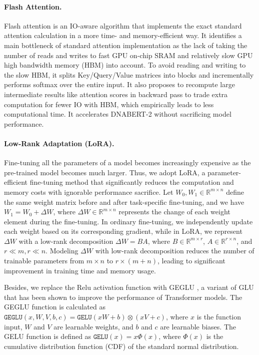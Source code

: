 \documentclass{article}
\begin{document}
\paragraph{Flash Attention.} Flash attention is an IO-aware algorithm that implements the exact standard attention calculation in a more time- and memory-efficient way. It identifies a main bottleneck of standard attention implementation as the lack of taking the number of reads and writes to fast GPU on-chip SRAM and relatively slow GPU high bandwidth memory (HBM) into account. To avoid reading and writing to the slow HBM, it splits Key/Query/Value matrices into blocks and incrementally performs softmax over the entire input. It also proposes to recompute large intermediate results like attention scores in backward pass to trade extra computation for fewer IO with HBM, which empirically leads to less computational time. It accelerates DNABERT-2 without sacrificing model performance.



\paragraph{Low-Rank Adaptation (LoRA). } Fine-tuning all the parameters of a model becomes increasingly expensive as the pre-trained model becomes much larger. Thus, we adopt LoRA, a parameter-efficient fine-tuning method that significantly reduces the computation and memory costs with ignorable performance sacrifice. Let $W_0, W_1 \in \mathbb{R}^{m \times n}$ define the same weight matrix before and after task-specific fine-tuning, and we have $W_1 = W_0 + \Delta W$, where $\Delta W \in \mathbb{R}^{m \times n}$ represents the change of each weight element during the fine-tuning. In ordinary fine-tuning, we independently update each weight based on its corresponding gradient, while in LoRA, we represent $\Delta W$ with a low-rank decomposition $\Delta W = BA$, where $B \in \mathbb{R}^{m \times r}$, $A \in \mathbb{R}^{r \times n}$, and $r \ll m, r \ll n$. Modeling $\Delta W$ with low-rank decomposition reduces the number of trainable parameters from $m \times n$ to $r \times (m+n)$, leading to significant improvement in training time and memory usage.


Besides, we replace the Relu activation function with GEGLU \citep{geglu}, a variant of GLU \citep{glu} that has been shown to improve the performance of Transformer models. The GEGLU function is calculated as $\texttt{GEGLU} (x, W, V, b, c) = \texttt{GELU} (xW + b) \otimes (xV + c)$, where $x$ is the function input, $W$ and $V$ are learnable weights, and $b$ and $c$ are learnable biases. The GELU function is defined as $\texttt{GELU} (x) = x\Phi(x)$, where $\Phi(x)$ is the cumulative distribution function (CDF) of the standard normal distribution.
\end{document}
